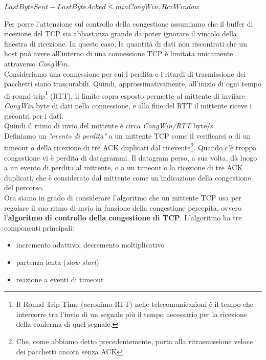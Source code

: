 \documentclass[11pt,a4paper]{article}
\begin{document}
\begin{center}
	$LastByteSent - LastByteAcked \leq min{CongWin, RcvWindow}$
\end{center}
Per porre l'attenzione sul controllo della congestione assumiamo che il buffer di ricezione del TCP sia abbastanza grande da poter ignorare il vincolo della finestra di ricezione. In questo caso, la quantità di dati non riscontrati che un host può avere all'interno di una connessione TCP è limitata unicamente attraverso \emph{CongWin}. \\
Consideriamo una connessione per cui l perdita e i ritardi di trasmissione dei pacchetti siano trascurabili. Quindi, approssimativamente, all'inizio di ogni tempo di round-trip\footnote{Il Round Trip Time (acronimo RTT) nelle telecomunicazioni è il tempo che intercorre tra l'invio di un segnale più il tempo necessario per la ricezione della conferma di quel segnale.} (RTT), il limite sopra esposto permette al mittente di inviiare \emph{CongWin} byte di dati nella connessione, e alla fine del RTT il mittente riceve i riscontri per i dati. \\
Quindi il ritmo di invio del mittente è circa \emph{CongWin/RTT} byte/s. \\
Definiamo un \textit{"evento di perdita"} a un mittente TCP come il verificarsi o di un timeout o della ricezione di tre ACK duplicati dal ricevente\footnote{Che, come abbiamo detto precedentemente, porta alla ritrasmissione veloce dei pacchetti ancora senza ACK}. Quando c'è troppa congestione vi è perdita di datagrammi. Il datagram perso, a sua volta, dà luogo a un evento di perdita al mittente, o a un timeout o la ricezione di tre ACK duplicati, che è considerato dal mittente come un'indicazione della congestione del percorso. \\
Ora siamo in grado di considerare l'algoritmo che un mittente TCP usa per regolare il suo ritmo di invio in funzione della congestione percepita, ovvero l'\textbf{algoritmo di controllo della congestione di TCP}. L'algoritmo ha tre componenti principali:
\begin{itemize}
	\item incremento adattivo, decremento moltiplicativo
	\item partenza lenta (\textit{slow start})
	\item reazione a eventi di timeout
\end{itemize}
\end{document}
